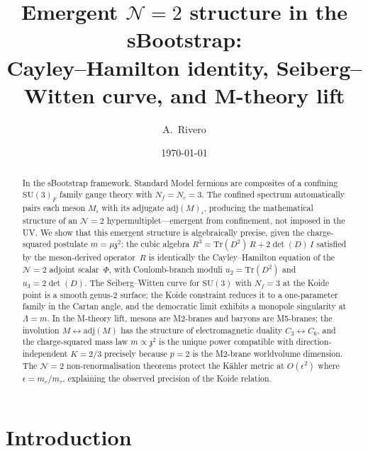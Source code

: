 \documentclass[aps,prd,twocolumn,showpacs,preprintnumbers,superscriptaddress,floatfix]{revtex4-2}
\newcommand{\SU}{\mathrm{SU}}
\newcommand{\Nf}{N_{\!f}}
\newcommand{\Nc}{N_{\!c}}
\newcommand{\Tr}{\mathrm{Tr}}
\newcommand{\adj}{\mathrm{adj}}
\newcommand{\zch}{\mathfrak{z}}
\begin{document}
\title{Emergent $\mathcal{N}{=}2$ structure in the sBootstrap:\\
  Cayley--Hamilton identity, Seiberg--Witten curve, and M-theory lift}

\author{A.~Rivero}

\date{\today}

\begin{abstract}
In the sBootstrap framework, Standard Model fermions are composites
of a confining $\SU(3)_F$ family gauge theory with $\Nf = \Nc = 3$.
The confined spectrum automatically pairs each meson $M_i$ with its
adjugate $\adj(M)_i$, producing the mathematical structure of an
$\mathcal{N}{=}2$ hypermultiplet---emergent from confinement, not
imposed in the UV\@.
We show that this emergent structure is algebraically precise, given
the charge-squared postulate $m = \mu\zch^2$:
the cubic algebra $R^3 = \Tr(D^2)\,R + 2\det(D)\,I$ satisfied by
the meson-derived operator~$R$ is identically the Cayley--Hamilton
equation of the $\mathcal{N}{=}2$ adjoint scalar~$\Phi$, with
Coulomb-branch moduli $u_2 = \Tr(D^2)$ and $u_3 = 2\det(D)$.
The Seiberg--Witten curve for $\SU(3)$ with $\Nf = 3$ at the Koide
point is a smooth genus-2 surface; the Koide constraint reduces it
to a one-parameter family in the Cartan angle, and the democratic
limit exhibits a monopole singularity at $\Lambda = m$.
In the M-theory lift, mesons are M2-branes and baryons are M5-branes;
the involution $M \leftrightarrow \adj(M)$ has the structure of
electromagnetic duality $C_3 \leftrightarrow C_6$, and the
charge-squared mass law
$m \propto \zch^2$ is the unique power compatible with
direction-independent $K = 2/3$ precisely because $p = 2$ is the
M2-brane worldvolume dimension.
The $\mathcal{N}{=}2$ non-renormalisation theorems protect the
K\"ahler metric at $O(\epsilon^2)$ where $\epsilon = m_e/m_\tau$,
explaining the observed precision of the Koide relation.
\end{abstract}

\maketitle


\section{Introduction}
\label{sec:intro}
\end{document}
